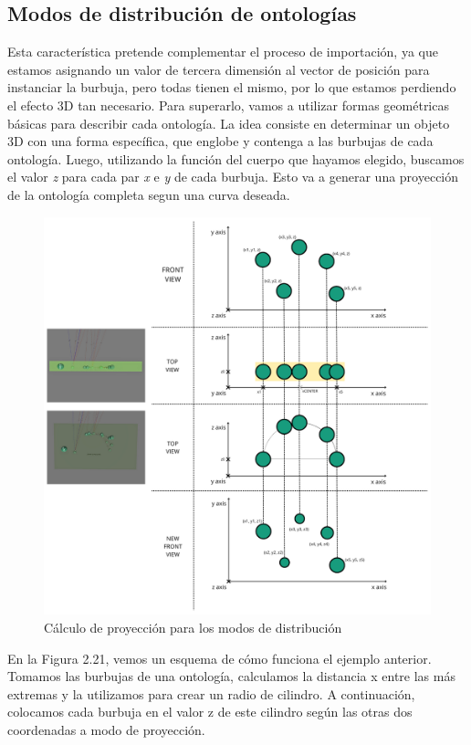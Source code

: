 \subsection{Modos de distribución de ontologías}

Esta característica pretende complementar el proceso de importación, ya que estamos asignando un valor de tercera dimensión al vector de posición para instanciar la burbuja, pero todas tienen el mismo, por lo que estamos perdiendo el efecto 3D tan necesario. Para superarlo, vamos a utilizar formas geométricas básicas para describir cada ontología.
La idea consiste en determinar un objeto 3D con una forma específica, que englobe y contenga a las burbujas de cada ontología. Luego, utilizando la función del cuerpo que hayamos elegido, buscamos el valor \textit{z} para cada par \textit{x} e \textit{y} de cada burbuja. Esto va a generar una proyección de la ontología completa segun una curva deseada.



\begin{figure}[ht]
   \begin{center}
      \includegraphics[width=1\linewidth]{chapter2/figures/clusters shape.png}
   \end{center}
   \caption[Cálculo de proyección para los modos de distribución]
   {\footnotesize Cálculo de proyección para los modos de distribución}
   \label{fig:mufigure17}
\end{figure}

En la Figura 2.21, vemos un esquema de cómo funciona el ejemplo anterior. Tomamos las burbujas de una ontología, calculamos la distancia x entre las más extremas y la utilizamos para crear un radio de cilindro. A continuación, colocamos cada burbuja en el valor z de este cilindro según las otras dos coordenadas a modo de proyección.
